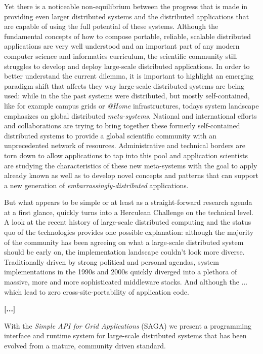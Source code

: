 \documentclass[a4paper,10pt]{article}
\begin{document}
 Yet there is a noticeable non-equilibrium between the progress that is made in providing
 even larger distributed systems and the distributed applications that are capable of
 using the full potential of these systems. Although the fundamental concepts of how to 
 compose portable, reliable, scalable distributed applications are very well understood and an 
 important part of any modern computer science and informatics curriculum, 
 the scientific community still struggles to develop and deploy large-scale distributed applications.
 In order to better understand the current dilemma, it is important to highlight an emerging paradigm 
 shift that affects they way large-scale distributed systems are being used: while in the the past 
 systems were distributed, but mostly self-contained, like for example campus grids or \textit{@Home}   
 infrastructures, todays system landscape emphasizes on global distributed \textit{meta-systems}. 
 National and international efforts and collaborations are trying to bring together these formerly
 self-contained distributed systems to provide a global scientific community with an unprecedented 
 network of resources. Administrative and technical borders are torn down to allow applications 
 to tap into this pool and application scientists are studying the characteristics of these new 
 meta-systems with the goal to apply already known as well as to develop novel concepts and 
 patterns that can support a new generation of \textit{embarrassingly-distributed} applications.
 
 But what appears to be simple or at least as a straight-forward research agenda at a first glance, 
 quickly turns into a Herculean Challenge on the technical level. A look at the recent history of 
 large-scale distributed computing and the status quo of the technologies provides one possible
 explanation: although
 the majority of the community has been agreeing on what a large-scale distributed system should
 be early on, the implementation landscape couldn't look more diverse. Traditionally 
 driven by strong political and personal agendas, system implementations in the 1990s and 2000s 
 quickly diverged into a plethora of massive, more and more sophisticated middleware stacks.
 And although the ... which lead to zero cross-site-portability of application code.
 
 
{\bf [...] }
 
 
 
 With the \textit{Simple API for Grid Applications} (SAGA) we present a programming interface and
 runtime system for large-scale distributed systems that has been evolved from a mature, community 
 driven standard. 
 
\end{document}
